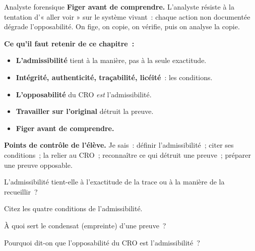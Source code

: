 \begin{boxmetier}{Analyste forensique}
\textbf{Figer avant de comprendre.} L'analyste résiste à la tentation
d'« aller voir » sur le système vivant~: chaque action non documentée dégrade
l'opposabilité. On fige, on copie, on vérifie, puis on analyse la copie.
\end{boxmetier}

\separateur

\begin{boxresume}
\textbf{Ce qu'il faut retenir de ce chapitre~:}
\begin{itemize}
    \item \textbf{L'admissibilité} tient à la manière, pas à la seule
          exactitude.
    \item \textbf{Intégrité, authenticité, traçabilité, licéité}~: les
          conditions.
    \item \textbf{L'opposabilité} du CRO \emph{est} l'admissibilité.
    \item \textbf{Travailler sur l'original} détruit la preuve.
    \item \textbf{Figer avant de comprendre.}
\end{itemize}
\end{boxresume}

\begin{boxinfo}
\textbf{Points de contrôle de l'élève.} Je sais~: définir l'admissibilité~;
citer ses conditions~; la relier au CRO~; reconnaître ce qui détruit une
preuve~; préparer une preuve opposable.
\end{boxinfo}

\bigskip

\begin{boxexo}[title={\ding{45}\quad Exercice~10.1. Définir \niveaubase}]
L'admissibilité tient-elle à l'exactitude de la trace ou à la manière de la
recueillir~?
\end{boxexo}

\begin{boxexo}[title={\ding{45}\quad Exercice~10.2. Conditions \niveaubase}]
Citez les quatre conditions de l'admissibilité.
\end{boxexo}

\begin{boxexo}[title={\ding{45}\quad Exercice~10.3. Condensat \niveaubase}]
À quoi sert le condensat (empreinte) d'une preuve~?
\end{boxexo}

\begin{boxexo}[title={\ding{45}\quad Exercice~10.4. CRO \niveaumoyen}]
Pourquoi dit-on que l'opposabilité du CRO est l'admissibilité~?
\end{boxexo}

